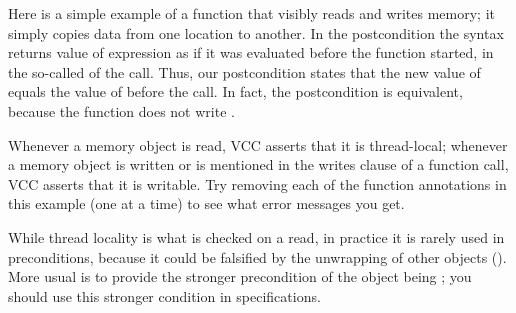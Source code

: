 Here is a simple example of a function that visibly reads and writes
memory; it simply copies data from one location to another.
In the postcondition the syntax  returns value
of expression  as if it was evaluated before the function
started, in the so-called  of the call.
Thus, our postcondition states that the new value of 
equals the value of  before the call.
In fact, the postcondition  is equivalent,
because the function does not write .



Whenever a memory object is read, VCC asserts that it is
thread-local; whenever a memory object is written or is
mentioned in the writes clause of a function call, VCC asserts that it
is writable. Try removing each of the function annotations in
this example (one at a time) to see what error messages you get.

While thread locality is what is checked on a read, in practice it is
rarely used in preconditions, because it could be falsified by the
unwrapping of other objects (). 
More usual is to provide the stronger precondition of the object being
\vcc{\unwrapped}; you should use this stronger condition in specifications.



